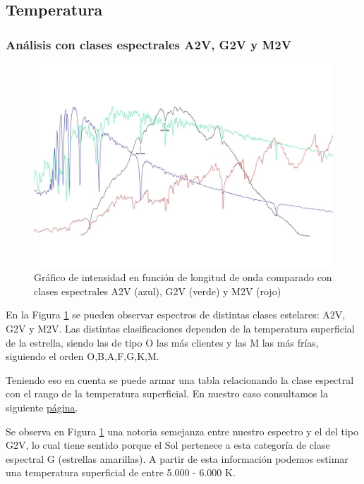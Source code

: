 \documentclass[11pt, a4paper]{article}
\begin{document}
\subsection{Temperatura}
\subsubsection{Análisis con clases espectrales A2V, G2V y M2V}
\begin{figure}[H]
    \centering
    \includegraphics[width=1\linewidth]{images/comparacion_de_perfiles_forro_page-0001.jpg}
    \captionsetup{justification=centering}
    \caption{Gráfico de intensidad en función de longitud de onda comparado con clases espectrales A2V (azul), G2V (verde) y M2V (rojo)}
    \label{fig:calibrado-con-clases-espectrales}
\end{figure}

En la Figura \ref{fig:calibrado-con-clases-espectrales} se pueden observar espectros de distintas clases estelares: A2V, G2V y M2V. Las distintas clasificaciones dependen de la temperatura superficial de la estrella, siendo las de tipo O las más clientes y las M las más frías, siguiendo el orden O,B,A,F,G,K,M. 

Teniendo eso en cuenta se puede armar una tabla relacionando la clase espectral con el rango de la temperatura superficial. En nuestro caso consultamos la siguiente \href{http://hyperphysics.phy-astr.gsu.edu/hbasees/Starlog/staspe.html}{página}.


Se observa en Figura \ref{fig:calibrado-con-clases-espectrales} una notoria semejanza entre nuestro espectro y el del tipo G2V, lo cual tiene sentido porque el Sol pertenece a esta categoría de clase espectral G (estrellas amarillas). A partir de esta información podemos estimar una temperatura superficial de entre 5.000 - 6.000 K.  
\end{document}
